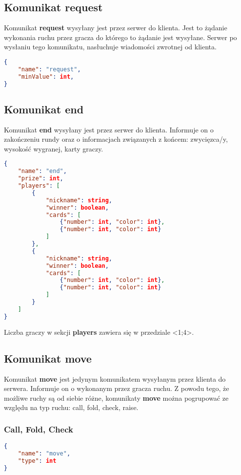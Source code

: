\documentclass{article}
\begin{document}
    \subsection{Komunikat request}
    Komunikat \textbf{request} wysyłany jest przez serwer do klienta.
    Jest to żądanie wykonania ruchu przez gracza do którego to żądanie jest wysyłane.
    Serwer po wysłaniu tego komunikatu, nasłuchuje wiadomości zwrotnej od klienta.
    
        \begin{lstlisting}[language=json,firstnumber=1]
{
    "name": "request",
    "minValue": int,
}
        \end{lstlisting}
    
    \subsection{Komunikat end}
        Komunikat \textbf{end} wysyłany jest przez serwer do klienta.
        Informuje on o zakończeniu rundy oraz o informacjach związanych z końcem: zwycięzca/y, wysokość wygranej, karty graczy.
        \begin{lstlisting}[language=json,firstnumber=1]
{
    "name": "end",
    "prize": int,
    "players": [
        {
            "nickname": string,
            "winner": boolean,
            "cards": [
                {"number": int, "color": int},
                {"number": int, "color": int}
            ]
        },
        {
            "nickname": string,
            "winner": boolean,
            "cards": [
                {"number": int, "color": int},
                {"number": int, "color": int}
            ]
        }
    ]
}
        \end{lstlisting}
        Liczba graczy w sekcji \textbf{players} zawiera się w przedziale <1;4>.
    
    \subsection{Komunikat move}
        Komunikat \textbf{move} jest jedynym komunikatem wysyłanym przez klienta do serwera.
        Informuje on o wykonanym przez gracza ruchu.
        Z powodu tego, że możliwe ruchy są od siebie różne, komunikaty \textbf{move} można pogrupować ze względu na typ ruchu: call, fold, check, raise.
        
        \subsubsection{Call, Fold, Check}
            \begin{lstlisting}[language=json,firstnumber=1]
{
    "name": "move",
    "type": int
}
            \end{lstlisting}
\end{document}
